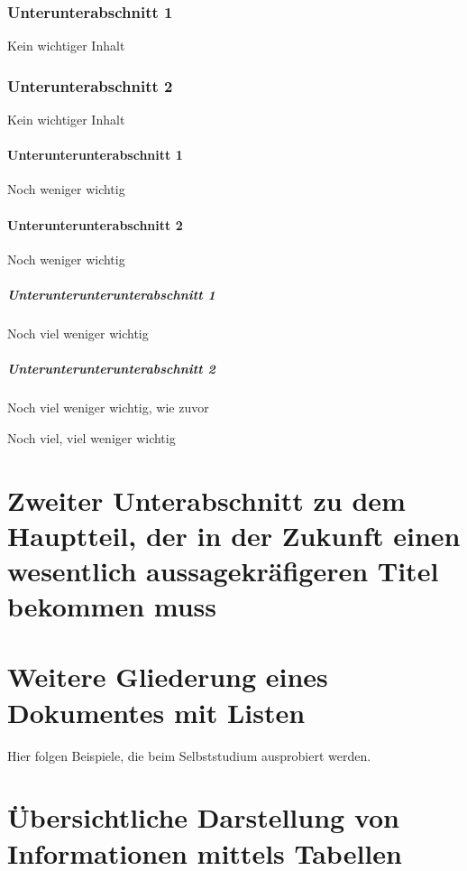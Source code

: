 \subsubsection{Unterunterabschnitt 1}

Kein wichtiger Inhalt

\subsubsection{Unterunterabschnitt 2}

Kein wichtiger Inhalt

\paragraph{Unterunterunterabschnitt 1}

Noch weniger wichtig

\paragraph{Unterunterunterabschnitt 2}

Noch weniger wichtig

\subparagraph{Unterunterunterunterabschnitt 1}

Noch viel weniger wichtig


\subparagraph{Unterunterunterunterabschnitt 2}

Noch viel weniger wichtig, wie zuvor


Noch viel, viel weniger wichtig


\section[Zweiter Unterabschnitt]{Zweiter Unterabschnitt zu dem Hauptteil,
  der in der Zukunft einen wesentlich aussagekräfigeren Titel bekommen
  muss}

\section[Listen]{Weitere Gliederung eines Dokumentes mit Listen}

Hier folgen Beispiele, die beim Selbststudium ausprobiert werden.

\section[Tabellen]{Übersichtliche Darstellung von Informationen mittels
  Tabellen}

